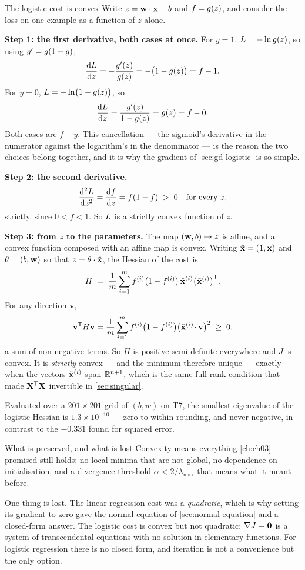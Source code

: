 \begin{derivation}{The logistic cost is convex}
Write $z = \mathbf{w}\cdot\mathbf{x} + b$ and $f = g(z)$, and consider the loss on one
example as a function of $z$ alone.

\textbf{Step 1: the first derivative, both cases at once.} For $y = 1$,
$L = -\ln g(z)$, so using $g' = g(1-g)$,
\[
  \frac{\mathrm{d} L}{\mathrm{d} z} = -\frac{g'(z)}{g(z)}
  = -\bigl(1-g(z)\bigr) = f - 1 .
\]
For $y = 0$, $L = -\ln\bigl(1-g(z)\bigr)$, so
\[
  \frac{\mathrm{d} L}{\mathrm{d} z} = \frac{g'(z)}{1-g(z)} = g(z) = f - 0 .
\]
Both cases are $f - y$. This cancellation --- the sigmoid's derivative in the
numerator against the logarithm's in the denominator --- is the reason the two
choices belong together, and it is why the gradient of
\cref{sec:gd-logistic} is so simple.

\textbf{Step 2: the second derivative.}
\[
  \frac{\mathrm{d}^2 L}{\mathrm{d} z^2} = \frac{\mathrm{d} f}{\mathrm{d} z}
  = f(1-f) \;>\; 0 \quad\text{for every } z,
\]
strictly, since $0 < f < 1$. So $L$ is a strictly convex function of $z$.

\textbf{Step 3: from $z$ to the parameters.} The map $(\mathbf{w},b)\mapsto z$ is
affine, and a convex function composed with an affine map is convex. Writing
$\tilde{\mathbf{x}} = (1, \mathbf{x})$ and $\theta = (b,\mathbf{w})$ so that $z = \theta\cdot\tilde{\mathbf{x}}$,
the Hessian of the cost is
\[
  H \;=\; \frac1m\sum_{i=1}^{m} f^{(i)}\bigl(1-f^{(i)}\bigr)\,
          \tilde{\mathbf{x}}^{(i)}\bigl(\tilde{\mathbf{x}}^{(i)}\bigr)^{\mathsf{T}} .
\]
For any direction $\mathbf{v}$,
\[
  \mathbf{v}^{\mathsf{T}} H \mathbf{v}
  = \frac1m\sum_{i=1}^{m} f^{(i)}\bigl(1-f^{(i)}\bigr)
    \bigl(\tilde{\mathbf{x}}^{(i)}\!\cdot\mathbf{v}\bigr)^2 \;\ge\; 0 ,
\]
a sum of non-negative terms. So $H$ is positive semi-definite everywhere and $J$
is convex. It is \emph{strictly} convex --- and the minimum therefore unique ---
exactly when the vectors $\tilde{\mathbf{x}}^{(i)}$ span $\mathbb{R}^{n+1}$, which is the
same full-rank condition that made $\mathbf{X}^{\mathsf{T}}\mathbf{X}$ invertible in
\cref{sec:singular}.
\end{derivation}

Evaluated over a $201\times201$ grid of $(b,w)$ on T7, the smallest eigenvalue of
the logistic Hessian is $1.3\times10^{-10}$ --- zero to within rounding, and
never negative, in contrast to the $-0.331$ found for squared error.

\begin{keyinsight}{What is preserved, and what is lost}
Convexity means everything \cref{ch:ch03} promised still holds: no local minima
that are not global, no dependence on initialisation, and a divergence threshold
$\alpha < 2/\lambda_{\max}$ that means what it meant before.

One thing is lost. The linear-regression cost was a \emph{quadratic}, which is
why setting its gradient to zero gave the normal equation of
\cref{sec:normal-equation} and a closed-form answer. The logistic cost is convex
but not quadratic: $\nabla J = \mathbf{0}$ is a system of transcendental
equations with no solution in elementary functions. For logistic regression
there is no closed form, and iteration is not a convenience but the only option.
\end{keyinsight}

